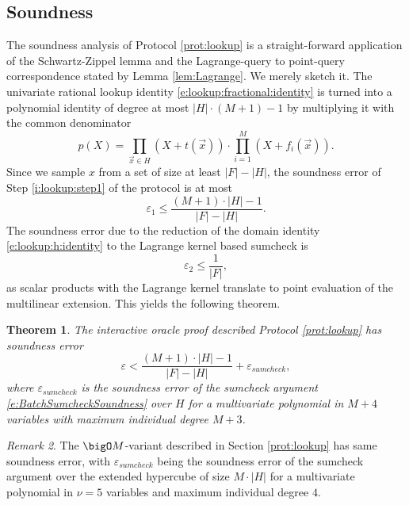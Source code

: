 \documentclass[11pt]{article}
\newtheorem{thm}{Theorem}[]
\theoremstyle{definition}
\theoremstyle{remark}
\newtheorem{rem}[thm]{Remark}
\begin{document}
\subsection{Soundness}
\label{s:lookup:soundness}

The soundness analysis of Protocol \ref{prot:lookup} is a straight-forward application of the Schwartz-Zippel lemma and the Lagrange-query to point-query correspondence stated by Lemma \ref{lem:Lagrange}.
We merely sketch it.
The univariate rational lookup identity \eqref{e:lookup:fractional:identity} is turned into a polynomial identity of degree at most $|H|\cdot (M+1) - 1$ by multiplying it with the common denominator  
\begin{equation}
\label{e:lookup:common:denominator}
p(X) = \prod_{\vec x\in H} (X + t(\vec x)) \cdot \prod_{i=1}^M (X + f_i(\vec x)).
\end{equation}
Since we sample $x$ from a set of size at least $|F|-|H|$, the soundness error of Step \ref{i:lookup:step1} of the protocol is at most 
\begin{equation}
\label{e:lookup:epsilon1}
\varepsilon_1 \leq \frac{(M+1)\cdot |H| - 1 }{|F|-|H|}.
\end{equation}
The soundness error due to the reduction of the domain identity  \eqref{e:lookup:h:identity}  to the Lagrange kernel based sumcheck is 
\[
\varepsilon_2 \leq \frac{1}{|F|},
\]
as scalar products with the Lagrange kernel translate to point evaluation of the multilinear extension.
This yields the following theorem. 

\begin{thm}
\label{thm:lookup:soundness}
 The interactive oracle proof described Protocol \ref{prot:lookup} has soundness error
\[
\varepsilon < \frac{(M+1)\cdot |H| - 1 }{|F|-|H|} + \varepsilon_{sumcheck},
\]
where $\varepsilon_{sumcheck}$ is the soundness error of the sumcheck argument \eqref{e:BatchSumcheckSoundness} over $H$ for a multivariate polynomial in $M+4$ variables with maximum individual degree $M+3$.
\end{thm}
\begin{rem}
The $\bigO M$-variant described in Section \ref{prot:lookup} has same soundness error, with $\varepsilon_{sumcheck}$ being the soundness error of the sumcheck argument over the extended hypercube of size $M\cdot |H|$ for a multivariate polynomial in $\nu=5$ variables and maximum individual degree $4$. 
\end{rem}
\end{document}

